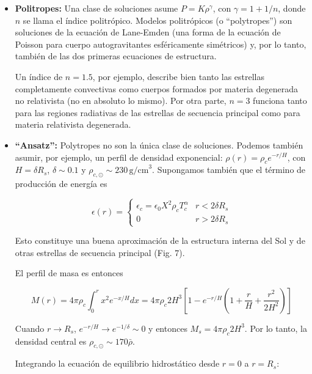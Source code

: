 \documentclass[11pt,letterpaper]{article}
\begin{document}
\begin{itemize}
    \item \textbf{Politropes:} Una clase de soluciones asume \(P = K\rho^\gamma\), con \(\gamma = 1+1/n\), donde \(n\) se llama el índice politrópico. Modelos politrópicos (o ``polytropes'') son soluciones de la ecuación de Lane-Emden (una forma de la ecuación de Poisson para cuerpo autogravitantes esféricamente simétricos) y, por lo tanto, también de las dos primeras ecuaciones de estructura.
    
    Un índice de \(n = 1.5\), por ejemplo, describe bien tanto las estrellas completamente convectivas como cuerpos formados por materia degenerada no relativista (no en absoluto lo mismo). Por otra parte, \(n = 3\) funciona tanto para las regiones radiativas de las estrellas de secuencia principal como para materia relativista degenerada.

    \item \textbf{``Ansatz'':} Polytropes no son la única clase de soluciones. Podemos también asumir, por ejemplo, un perfil de densidad exponencial: \(\rho(r) = \rho_c e^{-r/H}\), con \(H = \delta R_s\), \(\delta \sim 0.1\) y \(\rho_{c,\odot} \sim 230 \, \text{g/cm}^3\). Supongamos también que el término de producción de energía es
        
    \begin{equation}
        \epsilon(r) = \begin{cases} 
        \epsilon_c = \epsilon_0 X^2 \rho_c T_c^\alpha & r < 2 \delta R_s \\ 
        0 & r > 2 \delta R_s 
        \end{cases}
    \end{equation}

    Esto constituye una buena aproximación de la estructura interna del Sol y de otras estrellas de secuencia principal (Fig. 7).

    El perfil de masa es entonces

    \begin{equation}
        M(r) = 4\pi \rho_c \int_0^r x^2 e^{-x/H} dx = 4\pi \rho_c 2H^3 \left[ 1 - e^{-r/H} \left( 1 + \frac{r}{H} + \frac{r^2}{2H^2} \right) \right]
    \end{equation}

    Cuando \(r \to R_s\), \(e^{-r/H} \to e^{-1/\delta} \sim 0\) y entonces \(M_s = 4\pi \rho_c 2H^3\). Por lo tanto, la densidad central es \(\rho_{c,\odot} \sim 170\bar{\rho}\).

    Integrando la ecuación de equilibrio hidrostático desde \(r=0\) a \(r=R_s\):


\end{itemize}
\end{document}
